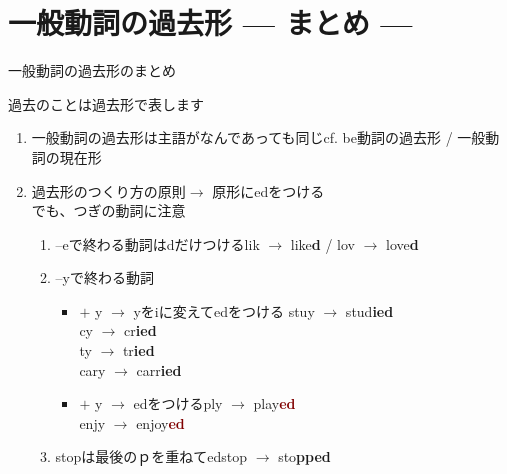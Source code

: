 \documentclass[aspectratio=169,xcolor={dvipsnames,table}]{beamer}
\begin{document}
\section{一般動詞の過去形 --- まとめ ---}
\begin{frame}[plain]{一般動詞の過去形のまとめ}
 \begin{block}{過去のことは過去形で表します}\small
\pause
\begin{enumerate}
 \item 一般動詞の過去形は主語がなんであっても同じ\hfill{}{\scriptsize cf. be動詞の過去形 / 一般動詞の現在形}\pause
 \item 過去形のつくり方の原則$\longrightarrow$ 原形にedをつける\\\pause
でも、つぎの動詞に注意\pause
       \begin{enumerate}
	\item --eで終わる動詞はdだけつける\hfill{}lik $\rightarrow$ like\textcolor{OliveGreen}{\bfseries d} / lov $\rightarrow$ love\textcolor{OliveGreen}{\bfseries d}\pause
	\item --yで終わる動詞\pause
\begin{itemize}[circle]
	         \item {} $+$ y $\longrightarrow$ yをiに変えてedをつける%
\hfill{}stuy $\rightarrow$ stud\textcolor{NavyBlue}{\bfseries ied}\\
\hfill{}cy $\rightarrow$ cr\textcolor{NavyBlue}{\bfseries ied}\\
\hfill{}ty $\rightarrow$ tr\textcolor{NavyBlue}{\bfseries ied}\\
\hfill{}cary $\rightarrow$ carr\textcolor{NavyBlue}{\bfseries ied}\pause
  \item {} $+$ y $\longrightarrow$ edをつける\hfill{}ply $\rightarrow$ play\textcolor{Maroon}{\bfseries ed}\\
\hfill{}enjy $\rightarrow$ enjoy\textcolor{Maroon}{\bfseries ed}\pause
	      \end{itemize}
	\item stopは最後のｐを重ねてed\hfill{}stop $\longrightarrow$ sto\textcolor{BurntOrange}{\bfseries pped}
       \end{enumerate}\pause
\end{enumerate}

\end{block}

\end{frame}
\end{document}
